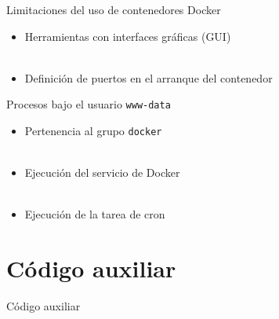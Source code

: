     \begin{frame}{Limitaciones del uso de contenedores Docker}
        \begin{itemize}
            \item Herramientas con interfaces gráficas (GUI)
            \\~\\
            \item Definición de puertos en el arranque del contenedor
        \end{itemize}
    \end{frame}

    \begin{frame}{Procesos bajo el usuario \texttt{www-data}}
        \begin{itemize}
            \item Pertenencia al grupo \texttt{docker}
            \\~\\
            \item Ejecución del servicio de Docker
            \\~\\
            \item Ejecución de la tarea de cron
        \end{itemize}
    \end{frame}

    
\section{Código auxiliar}

    \begin{frame}
        \Huge{\centerline{Código auxiliar}}
    \end{frame}


